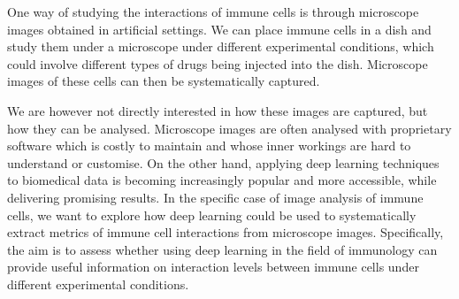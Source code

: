 One way of studying the interactions of immune cells is through microscope images obtained in artificial settings. We can place immune cells in a dish and study them under a microscope under different experimental conditions, which could involve different types of drugs being injected into the dish. Microscope images of these cells can then be systematically captured.

We are however not directly interested in how these images are captured, but how they can be analysed. Microscope images are often analysed with proprietary software which is costly to maintain and whose inner workings are hard to understand or customise. On the other hand, applying deep learning techniques to biomedical data is becoming increasingly popular and more accessible, while delivering promising results. In the specific case of image analysis of immune cells, we want to explore how deep learning could be used to systematically extract metrics of immune cell interactions from microscope images. Specifically, the aim is to assess whether using deep learning in the field of immunology can provide useful information on interaction levels between immune cells under different experimental conditions. 
